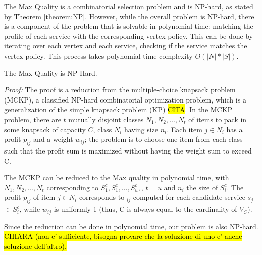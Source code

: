 \vspace{0.5em}

The Max Quality \problem is a combinatorial selection problem and is NP-hard, as stated by Theorem \cref{theorem:NP}. However, while the overall problem is NP-hard, there is a component of the problem that is solvable in polynomial time: matching the profile of each service with the corresponding vertex policy. This can be done by iterating over each vertex and each service, checking if the service matches the vertex policy. This process takes polynomial time complexity $O(|N|*|S|)$.

\vspace{0.5em}

\begin{theorem}\label{theorem:NP}
  The Max-Quality \problem is NP-Hard.
\end{theorem}
\emph{Proof: }
The proof is a reduction from the multiple-choice knapsack problem (MCKP), a classified NP-hard combinatorial optimization problem, which is a generalization of the simple knapsack problem (KP) \cite{}\hl{CITA}. In the MCKP problem, there are $t$ mutually disjoint classes $N_1,N_2,\ldots,N_t$ of items to pack in some knapsack of capacity $C$, class $N_i$ having size $n_i$. Each item $j$$\in$$N_i$ has a profit $p_{ij}$ and a weight $w_{ij}$; the problem is to choose one item from each class such that the profit sum is maximized without having the weight sum to exceed C.

The MCKP can be reduced to the Max quality \problem in polynomial time, with $N_1,N_2,\ldots,N_t$ corresponding to $S^c_{1}, S^c_{1}, \ldots, S^c_{u},$, $t$$=$$u$ and $n_i$ the size of $S^c_{i}$. The profit $p_{ij}$ of item $j$$\in$$N_i$ corresponds to \textit{\q}$_{ij}$ computed for each candidate service $s_j$$\in$$S^c_{i}$, while $w_{ij}$ is uniformly 1 (thus, C is always equal to the cardinality of $V_C$).

Since the reduction can be done in polynomial time, our problem is also NP-hard. \hl{CHIARA (non e' sufficiente, bisogna provare che la soluzione di uno e' anche soluzione dell'altro).}

\vspace{0.5em}

